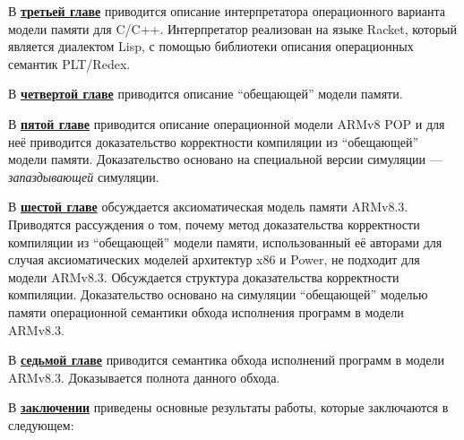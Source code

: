 В \underline{\textbf{третьей главе}} приводится описание интерпретатора операционного варианта модели памяти для C/C++.
Интерпретатор реализован на языке Racket, который является диалектом Lisp, с помощью библиотеки описания операционных
семантик PLT/Redex.

В \underline{\textbf{четвертой главе}} приводится описание ``обещающей'' модели памяти.

В \underline{\textbf{пятой главе}} приводится описание операционной модели ARMv8 POP и для неё
приводится доказательство корректности компиляции из ``обещающей'' модели памяти.
Доказательство основано на специальной версии симуляции --- \emph{запаздывающей} симуляции.

В \underline{\textbf{шестой главе}} обсуждается аксиоматическая модель памяти ARMv8.3.
Приводятся рассуждения о том, почему
метод доказательства корректности компиляции из ``обещающей'' модели памяти, использованный её авторами для случая
аксиоматических моделей архитектур x86 и Power, не подходит для модели ARMv8.3.
Обсуждается структура доказательства корректности компиляции. Доказательство основано на симуляции ``обещающей'' моделью
памяти операционной семантики обхода исполнения программ в модели ARMv8.3.

В \underline{\textbf{седьмой главе}} приводится семантика обхода исполнений программ в модели ARMv8.3. Доказывается
полнота данного обхода.

В \underline{\textbf{заключении}} приведены основные результаты работы, которые заключаются в следующем:







